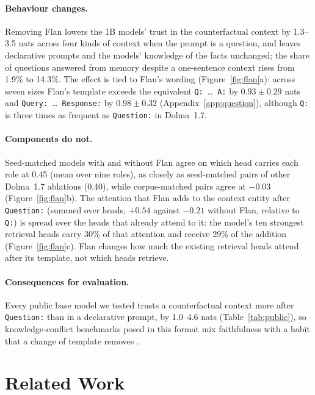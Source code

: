 \documentclass[11pt]{article}
\newcommand{\tmpl}[1]{\texttt{#1}}
\begin{document}
\paragraph{Behaviour changes.}
Removing Flan lowers the 1B models' trust in the counterfactual context by 1.3--3.5 nats across four kinds of context when the prompt is a question, and leaves declarative prompts and the models' knowledge of the facts unchanged; the share of questions answered from memory despite a one-sentence context rises from 1.9\% to 14.3\%.
The effect is tied to Flan's wording (Figure~\ref{fig:flan}a): across seven sizes Flan's template exceeds the equivalent \tmpl{Q:}~\dots~\tmpl{A:} by $0.93 \pm 0.29$ nats and \tmpl{Query:}~\dots~\tmpl{Response:} by $0.98 \pm 0.32$ (Appendix~\ref{app:question}), although \tmpl{Q:} is three times as frequent as \tmpl{Question:} in Dolma~1.7.

\paragraph{Components do not.}
Seed-matched models with and without Flan agree on which head carries each role at 0.45 (mean over nine roles), as closely as seed-matched pairs of other Dolma~1.7 ablations (0.40), while corpus-matched pairs agree at $-0.03$ (Figure~\ref{fig:flan}b).
The attention that Flan adds to the context entity after \tmpl{Question:} (summed over heads, $+0.54$ against $-0.21$ without Flan, relative to \tmpl{Q:}) is spread over the heads that already attend to it: the model's ten strongest retrieval heads carry 30\% of that attention and receive 29\% of the addition (Figure~\ref{fig:flan}c).
Flan changes how much the existing retrieval heads attend after its template, not which heads retrieve.

\paragraph{Consequences for evaluation.}
Every public base model we tested trusts a counterfactual context more after \tmpl{Question:} than in a declarative prompt, by 1.0--4.6 nats (Table~\ref{tab:public}), so knowledge-conflict benchmarks posed in this format mix faithfulness with a habit that a change of template removes \citep{sclar2024quantifying,hua2025flaw}.

\section{Related Work}
\label{sec:related}
\end{document}
